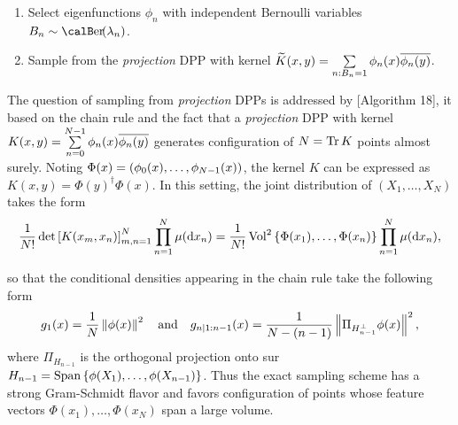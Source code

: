 \documentclass[twoside,11pt]{article}
\begin{document}
      \begin{enumerate}
        \item Select eigenfunctions $\phi_n$ with independent Bernoulli variables $B_n \sim \Ber(\lambda_n)$.
        \item Sample from the \textit{projection} DPP with kernel $\widetilde{K}(x,y) = \sum\limits_{n: B_n=1}\phi_n(x) \overline{\phi_n(y)}$.
      \end{enumerate}

      The question of sampling from \textit{projection} DPPs is addressed by \citet{HKPV06}[Algorithm 18], it based on the chain rule and the fact that a \textit{projection} DPP with kernel 
      $K(x,y)=\sum\limits_{n=0}^{N-1} \phi_n(x) \overline{\phi_n(y)}$ generates configuration of $N=\operatorname{Tr} K$ points almost surely.
      Noting $\Phi(x)=\left( \phi_0(x), \dots, \phi_{N-1}(x) \right)$, the kernel $K$ can be expressed as $K(x,y) = \Phi(y)^{\dagger} \Phi(x)$.
      In this setting, the joint distribution of $(X_1,\dots,X_N)$ takes the form
      \begin{equation}
        \frac{1}{N!} \det \left[ K(x_m,x_n) \right]_{m,n=1}^N \prod_{n=1}^N\mu(\mathop{}\!\mathrm{d} x_n)
          = \frac{1}{N!} \operatorname{Vol}^2\left\{ \Phi(x_1),\dots,\Phi(x_n) \right\} \prod_{n=1}^N\mu(\mathop{}\!\mathrm{d} x_n),
      \end{equation}

      so that the conditional densities appearing in the chain rule take the following form
      \begin{equation}
        g_1(x) 
          = \frac{1}{N} \left\| \phi(x) \right\|^2 
          \quad\text{and}\quad
        g_{n | 1:n-1}(x) 
          = \frac{1}{N-(n-1)} \left\|  \Pi_{H_{n-1}^{\perp}} \phi(x) \right\|^2,
      \end{equation}
      where $\Pi_{H_{n-1}}$ is the orthogonal projection onto sur 
      $H_{n-1} = \operatorname{Span}\left\{ \phi(X_1), \dots, \phi(X_{n-1})  \right\}$.
      Thus the exact sampling scheme has a strong Gram-Schmidt flavor and favors configuration of points whose feature vectors $\Phi(x_1),\dots, \Phi(x_N)$ span a large volume.\\
    
\end{document}
